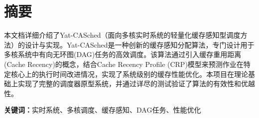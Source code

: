 
\section*{摘要}

本文档详细介绍了Yat-CASched（面向多核实时系统的轻量化缓存感知型调度方法）的设计与实现。Yat-CASched是一种创新的缓存感知分配算法，专门设计用于多核系统中有向无环图(DAG)任务的高效调度。该算法通过引入缓存重用距离(Cache Recency)的概念，结合Cache Recency Profile (CRP)模型来预测作业在特定核心上的执行时间改进情况，实现了系统级别的缓存性能优化。本项目在理论基础上实现了完整的调度器原型系统，并通过详尽的测试验证了算法的有效性和优越性。

\textbf{关键词：}实时系统、多核调度、缓存感知、DAG任务、性能优化

